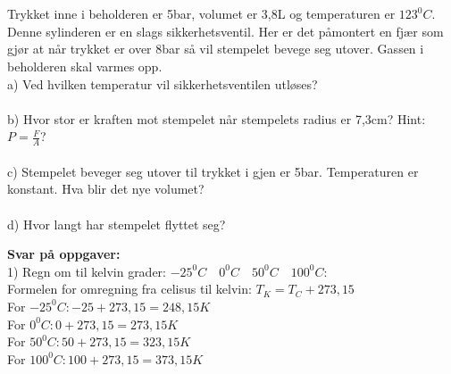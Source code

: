 \documentclass[12pt,a4paper]{article}
\begin{document}
\begin{enumerate}
\begin{figure}[h]
\end{figure}\\\\
Trykket inne i beholderen er 5bar, volumet er 3,8L og temperaturen er $123^0C$.  Denne sylinderen er en slags sikkerhetsventil.  Her er det påmontert en fjær som gjør at når trykket er over 8bar så vil stempelet bevege seg utover. Gassen i beholderen skal varmes opp.\\
a) Ved hvilken temperatur vil sikkerhetsventilen utløses?\\\\
b) Hvor stor er kraften mot stempelet når stempelets radius er 7,3cm? Hint: $P=\frac{F}{A}$?\\\\
c) Stempelet beveger seg utover til trykket i gjen er 5bar.  Temperaturen er konstant.  Hva blir det nye volumet?\\\\
d) Hvor langt har stempelet flyttet seg?
\end{enumerate}\vspace{1cm}
\textbf{Svar på oppgaver:}\\
1) Regn om til kelvin grader: $-25^0C\quad 0^0C \quad 50^0C \quad 100^0C$: \\
Formelen for omregning fra celisus til kelvin:  $T_K=T_C+273,15$\\
For $-25^0C: -25+273,15=248,15K$\\
For $0^0C: 0+273,15=273,15K$\\
For $50^0C: 50+273,15=323,15K$\\
For $100^0C: 100+273,15=373,15K$\\\\
\end{document}
